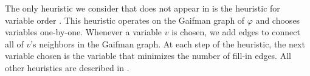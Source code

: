 The only heuristic we consider that does not appear in \cite{DPV20} is the \Minfill{} heuristic for variable order \cite{dechter03}. 
This heuristic operates on the Gaifman graph of $\varphi$ and chooses variables one-by-one.
Whenever a variable $v$ is chosen, we add  edges to connect all of $v$'s neighbors in the Gaifman graph.
At each step of the \Minfill{} heuristic, the next variable chosen is the variable that minimizes the number of fill-in edges.
All other heuristics are described in \cite{DPV20}.

